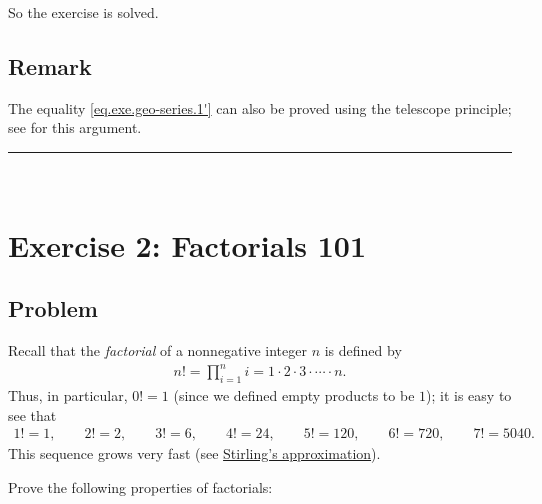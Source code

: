 \documentclass[paper=a4, fontsize=12pt]{scrartcl} %
\newcommand{\horrule}[1]{\rule{\linewidth}{#1}} %
\let\prodnonlimits\prod
\renewcommand{\prod}{\prodnonlimits\limits}
\theoremstyle{plainsl}
\theoremstyle{definition}
\theoremstyle{remark}
\begin{document}
So the exercise is solved.

\subsection{Remark}

The equality \eqref{eq.exe.geo-series.1'} can also be proved using
the telescope principle; see \cite[(18)]{detnotes} for this
argument.

\horrule{0.3pt} \\[0.4cm]

\section{Exercise 2: Factorials 101}

\subsection{Problem}

Recall that the \textit{factorial} of a nonnegative integer $n$
is defined by
\begin{align*}
n! = \prod_{i=1}^n i = 1 \cdot 2 \cdot 3 \cdot \cdots \cdot n .
\end{align*}
Thus, in particular, $0! = 1$ (since we defined empty products
to be $1$); it is easy to see that
\begin{align*}
1! = 1, \qquad
2! = 2, \qquad
3! = 6, \qquad
4! = 24, \qquad
5! = 120, \qquad
6! = 720, \qquad
7! = 5040.
\end{align*}
This sequence grows very fast (see
\href{https://en.wikipedia.org/wiki/Stirling%27s_approximation}{Stirling's approximation}).

Prove the following properties of factorials:
\end{document}
